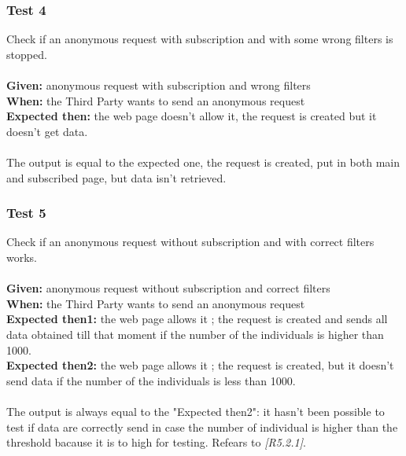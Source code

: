 \subsubsection{\Large{Test 4}}
Check if an anonymous request with subscription and with some wrong filters is stopped.\\
\\
\textbf{Given: } anonymous request with subscription and wrong filters\\
\textbf{When: } the Third Party wants to send an anonymous request\\
\textbf{Expected then: } the web page doesn't allow it, the request is created but it doesn't get data.\\
\\
The output is equal to the expected one, the request is created, put in both main and subscribed page, but data isn't retrieved.

\subsubsection{\Large{Test 5}}
Check if an anonymous request without subscription and with correct filters works.\\
\\
\textbf{Given: } anonymous request without subscription and correct filters\\
\textbf{When: } the Third Party wants to send an anonymous request\\
\textbf{Expected then1: }the web page allows it ; the request is created and sends all data obtained till that moment if the number of the individuals is higher than 1000.\\
\textbf{Expected then2: }the web page allows it ; the request is created, but it doesn't send data if the number of the individuals is less than 1000.\\
\\
The output is always equal to the "Expected then2": it hasn't been possible to test if data are correctly send in case the number of individual is higher than the threshold bacause it is to high for testing.
Refears to \textit{[R5.2.1]}.

